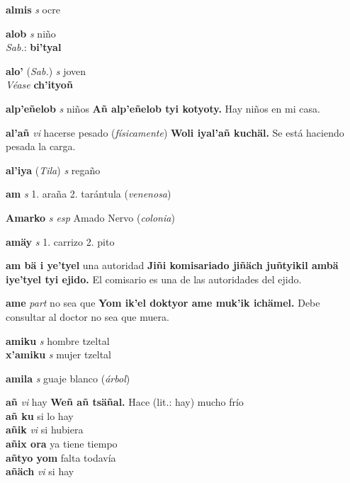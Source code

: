 \documentclass[10pt]{scrbook}
\newcommand{\entry}[1]{\textbf{#1}}
\newcommand{\onedefinition}[1]{#1.}
\newcommand{\partofspeech}[1]{\textit{#1}}
\newcommand{\spanishtranslation}[1]{#1}
\newcommand{\clarification}[1]{(\textit{#1})}
\newcommand{\cholexample}[1]{\textbf{#1}}
\newcommand{\exampletranslation}[1]{#1}
\newcommand{\dialectvariant}[1]{\\\textit{#1}:}
\newcommand{\dialectword}[1]{\textbf{#1}}
\newcommand{\alsosee}[1]{\\\textit{Véase} \textbf{#1}}
\newcommand{\relevantdialect}[1]{(\textit{#1})}
\newcommand{\secondaryentry}[1]{\\\textbf{#1}}
\newcommand{\secondpartofspeech}[1]{\textit{#1}}
\newcommand{\secondtranslation}[1]{#1}
\begin{document}
\begin{multicols}{2}
\entry{almis}
\partofspeech{s}
\spanishtranslation{ocre}

\entry{alob}
\partofspeech{s}
\spanishtranslation{niño}
\dialectvariant{Sab.}
\dialectword{bi'tyal}

\entry{alo'}
\relevantdialect{Sab.}
\partofspeech{s}
\spanishtranslation{joven}
\alsosee{ch'ityoñ}

\entry{alp'eñelob}
\partofspeech{s}
\spanishtranslation{niños}
\cholexample{Añ alp'eñelob tyi kotyoty.}
\exampletranslation{Hay niños en mi casa.}

\entry{al'añ}
\partofspeech{vi}
\spanishtranslation{hacerse pesado}
\clarification{físicamente}
\cholexample{Woli iyal'añ kuchäl.}
\exampletranslation{Se está haciendo pesada la carga.}

\entry{al'iya}
\relevantdialect{Tila}
\partofspeech{s}
\spanishtranslation{regaño}

\entry{am}
\partofspeech{s}
\onedefinition{1}
\spanishtranslation{araña}
\onedefinition{2}
\spanishtranslation{tarántula}
\clarification{venenosa}

\entry{Amarko}
\partofspeech{s esp}
\spanishtranslation{Amado Nervo}
\clarification{colonia}

\entry{amäy}
\partofspeech{s}
\onedefinition{1}
\spanishtranslation{carrizo}
\onedefinition{2}
\spanishtranslation{pito}

\entry{am bä i ye'tyel}
\spanishtranslation{una autoridad}
\cholexample{Jiñi komisariado jiñäch juñtyikil ambä iye'tyel tyi ejido.}
\exampletranslation{El comisario es una de las autoridades del ejido.}

\entry{ame}
\partofspeech{part}
\spanishtranslation{no sea que}
\cholexample{Yom ik'el doktyor ame muk'ik ichämel.}
\exampletranslation{Debe consultar al doctor no sea que muera.}

\entry{amiku}
\partofspeech{s}
\spanishtranslation{hombre tzeltal}
\secondaryentry{x'amiku}
\secondpartofspeech{s}
\secondtranslation{mujer tzeltal}

\entry{amila}
\partofspeech{s}
\spanishtranslation{guaje blanco}
\clarification{árbol}

\entry{añ}
\partofspeech{vi}
\spanishtranslation{hay}
\cholexample{Weñ añ tsäñal.}
\exampletranslation{Hace (lit.: hay) mucho frío}
\secondaryentry{añ ku}
\secondtranslation{si lo hay}
\secondaryentry{añik}
\secondpartofspeech{vi}
\secondtranslation{si hubiera}
\secondaryentry{añix ora}
\secondtranslation{ya tiene tiempo}
\secondaryentry{añtyo yom}
\secondtranslation{falta todavía}
\secondaryentry{añäch}
\secondpartofspeech{vi}
\secondtranslation{si hay}


\end{multicols}
\end{document}
